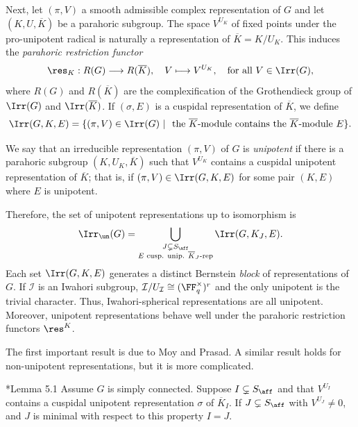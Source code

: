 Next, let $(\pi,V)$ a smooth admissible complex representation of $G$ and let $(K,U,\overline{K})$ be a parahoric subgroup. The space $V^{U_K}$ of fixed points under the pro-unipotent radical is naturally a representation of $\overline{K}=K/U_K$. This induces the \textit{parahoric restriction functor}
\begin{equation}\label{eqn:par_restriction}
    \res_K:R(G)\longrightarrow R(\overline{K}),\quad V\longmapsto V^{U_K},\quad\text{for all }V\in\Irr(G),
\end{equation}
where $R(G)$ and $R(\overline{K})$ are the complexification of the Grothendieck group of $\Irr(G)$ and $\Irr(\overline{K})$. If $(\sigma,E)$ is a cuspidal representation of $\overline{K}$, we define
$$\Irr(G,K,E)=\{(\pi,V)\in\Irr(G)\ |\ \text{ the }\overline{K}\text{-module contains the }\overline{K}\text{-module }E\}.$$
\begin{definition}
    We say that an irreducible representation $(\pi,V)$ of $G$ is \textit{unipotent} if there is a parahoric subgroup $(K,U_K,\overline{K})$ such that $V^{U_K}$ contains a cuspidal unipotent representation of $\overline{K}$; that is, if $(\pi,V)\in\Irr(G,K,E)$ for some pair $(K,E)$ where $E$ is unipotent.
\end{definition}
Therefore, the set of unipotent representations up to isomorphism is
$$\Irr_{\un}(G)=\bigcup_{\substack{J\subsetneq S_{\aff}\\ E \text{ cusp. unip. $\overline{K}_J$-rep}}}\Irr(G,K_J,E).$$
Each set $\Irr(G,K,E)$ generates a distinct Bernstein \textit{block} of representations of $G$. If $\mathcal{I}$ is an Iwahori subgroup, $\mathcal{I}/U_\mathcal{I}\cong(\FF_q^\times)^r$ and the only unipotent is the trivial character. Thus, Iwahori-spherical representations are all unipotent. Moreover, unipotent representations behave well under the parahoric restriction functors $\res^K$. 

The first important result is due to Moy and Prasad. A similar result holds for non-unipotent representations, but it is more complicated. 
\begin{proposition}\label{thm:unip_restriction}\cite{Reeder2000}*{Lemma 5.1}
    Assume $G$ is simply connected. Suppose $I\subsetneq S_{\aff}$ and that $V^{U_I}$ contains a cuspidal unipotent representation $\sigma$ of $\overline{K}_I$. If $J\subsetneq S_{\aff}$ with $V^{U_J}\neq 0$, and $J$ is minimal with respect to this property $I=J$.
\end{proposition}
